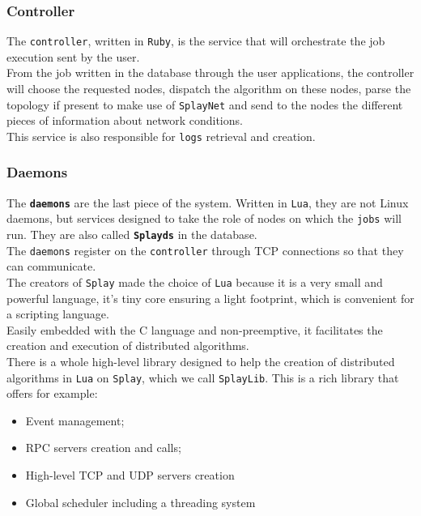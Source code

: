 \documentclass{eplmastersthesis}
\begin{document}
        \subsubsection{Controller}

          The \texttt{controller}, written in \texttt{Ruby}, is the service
          that will orchestrate the job execution sent by the user.\\
          From the job written in the database through the user applications,
          the controller will choose the requested nodes, dispatch the
          algorithm on these nodes, parse the topology if present to make
          use of \texttt{SplayNet} and send to the nodes the different
          pieces of information about network conditions.\\
          This service is also responsible for \texttt{logs}
          retrieval and creation.

        \subsubsection{Daemons}

          The \textbf{\texttt{daemons}} are the last piece of the system.
          Written in \texttt{Lua}, they are not Linux daemons, but services designed
          to take the role of nodes on which the \texttt{jobs} will
          run. They are also called \textbf{\texttt{Splayds}} in the
          database.\\
          The \texttt{daemons} register on the
          \texttt{controller} through TCP connections so that they
          can communicate.\\

          The creators of \texttt{Splay} made the choice of \texttt{Lua} because it is a very
          small and powerful language, it's tiny core ensuring a light
          footprint, which is convenient for a scripting language.\\
          Easily embedded with the C language and non-preemptive, it
          facilitates the creation and execution of distributed algorithms.\\

          There is a whole high-level library designed to help the creation of
          distributed algorithms in \texttt{Lua} on \texttt{Splay}, which we
          call \texttt{SplayLib}. This is a rich library that offers for
          example:

          \begin{itemize}
            \item Event management;
            \item RPC servers creation and calls;
            \item High-level TCP and UDP servers creation
            \item Global scheduler including a threading system
          \end{itemize}
\end{document}
